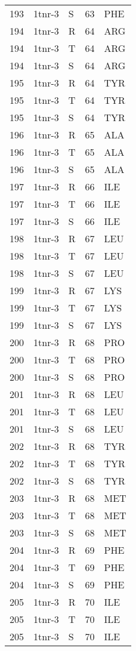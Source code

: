 \begin{longtable}[l]{l|l|l|l|l}
	193 & 1tnr-3 & S & 63 & PHE \\
	194 & 1tnr-3 & R & 64 & ARG \\
	194 & 1tnr-3 & T & 64 & ARG \\
	194 & 1tnr-3 & S & 64 & ARG \\
	195 & 1tnr-3 & R & 64 & TYR \\
	195 & 1tnr-3 & T & 64 & TYR \\
	195 & 1tnr-3 & S & 64 & TYR \\
	196 & 1tnr-3 & R & 65 & ALA \\
	196 & 1tnr-3 & T & 65 & ALA \\
	196 & 1tnr-3 & S & 65 & ALA \\
	197 & 1tnr-3 & R & 66 & ILE \\
	197 & 1tnr-3 & T & 66 & ILE \\
	197 & 1tnr-3 & S & 66 & ILE \\
	198 & 1tnr-3 & R & 67 & LEU \\
	198 & 1tnr-3 & T & 67 & LEU \\
	198 & 1tnr-3 & S & 67 & LEU \\
	199 & 1tnr-3 & R & 67 & LYS \\
	199 & 1tnr-3 & T & 67 & LYS \\
	199 & 1tnr-3 & S & 67 & LYS \\
	200 & 1tnr-3 & R & 68 & PRO \\
	200 & 1tnr-3 & T & 68 & PRO \\
	200 & 1tnr-3 & S & 68 & PRO \\
	201 & 1tnr-3 & R & 68 & LEU \\
	201 & 1tnr-3 & T & 68 & LEU \\
	201 & 1tnr-3 & S & 68 & LEU \\
	202 & 1tnr-3 & R & 68 & TYR \\
	202 & 1tnr-3 & T & 68 & TYR \\
	202 & 1tnr-3 & S & 68 & TYR \\
	203 & 1tnr-3 & R & 68 & MET \\
	203 & 1tnr-3 & T & 68 & MET \\
	203 & 1tnr-3 & S & 68 & MET \\
	204 & 1tnr-3 & R & 69 & PHE \\
	204 & 1tnr-3 & T & 69 & PHE \\
	204 & 1tnr-3 & S & 69 & PHE \\
	205 & 1tnr-3 & R & 70 & ILE \\
	205 & 1tnr-3 & T & 70 & ILE \\
	205 & 1tnr-3 & S & 70 & ILE \\

\end{longtable}
